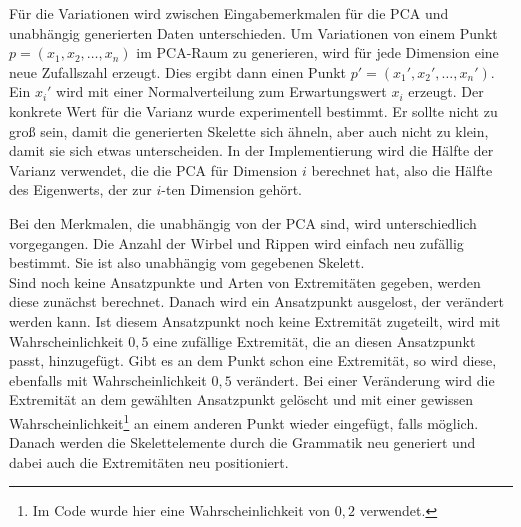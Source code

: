 Für die Variationen wird zwischen Eingabemerkmalen für die PCA und unabhängig generierten Daten unterschieden. Um Variationen von einem Punkt $p = (x_1, x_2,\dots, x_n)$ im PCA-Raum zu generieren, wird für jede Dimension eine neue Zufallszahl erzeugt. Dies ergibt dann einen Punkt $p' = (x_1', x_2',\dots,x_n')$. Ein $x_i'$ wird mit einer Normalverteilung zum Erwartungswert $x_i$ erzeugt.
Der konkrete Wert für die Varianz wurde experimentell bestimmt. Er sollte nicht zu groß sein, damit die generierten Skelette sich ähneln, aber auch nicht zu klein, damit sie sich etwas unterscheiden. In der Implementierung wird
die Hälfte der Varianz verwendet, die die PCA für Dimension $i$ berechnet hat, also die Hälfte des Eigenwerts, der zur $i$-ten Dimension gehört. 

Bei den Merkmalen, die unabhängig von der PCA sind, wird unterschiedlich vorgegangen. Die Anzahl der Wirbel und Rippen wird einfach neu zufällig bestimmt. Sie ist also unabhängig vom gegebenen Skelett.\\
Sind noch keine Ansatzpunkte und Arten von Extremitäten gegeben, werden diese zunächst berechnet. Danach wird ein Ansatzpunkt ausgelost, der verändert werden kann. Ist diesem Ansatzpunkt noch keine Extremität zugeteilt, wird mit Wahrscheinlichkeit $0{,}5$ eine zufällige Extremität, die an diesen Ansatzpunkt passt, hinzugefügt. Gibt es an dem Punkt schon eine Extremität, so wird diese, ebenfalls mit Wahrscheinlichkeit $0{,}5$ verändert. Bei einer Veränderung wird die Extremität an dem gewählten Ansatzpunkt gelöscht und mit einer gewissen Wahrscheinlichkeit\footnote{Im Code wurde hier eine Wahrscheinlichkeit von $0{,}2$ verwendet.} an einem anderen Punkt wieder eingefügt, falls möglich.\\
Danach werden die Skelettelemente durch die Grammatik neu generiert und dabei auch die Extremitäten neu positioniert.



